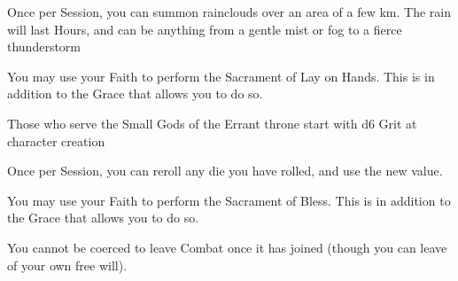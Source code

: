 {\GOD[
Name=Tlaloc,
Link=small-god-tlaloc,
GodOf=Archon of the Rains,
Holy=a wreath of ferns and mosses
]


Once per Session, you can summon rainclouds over an area of a few km.  The rain will last Hours, and can be anything from a gentle mist or fog to a fierce thunderstorm


You may use your Faith to perform the Sacrament of Lay on Hands.  This is in addition to the Grace that allows you to do so.

\newpage






Those who serve the Small Gods of the Errant throne start with d6 Grit at character creation





\GOD[
Name=Balo,
Link=small-god-balo,
GodOf=Archon of Games and Contests,
Holy=a leather bag of bone dice hung from the neck or belt
]


Once per Session, you can reroll any die you have rolled, and use the new value.


You may use your Faith to perform the Sacrament of Bless.  This is in addition to the Grace that allows you to do so.




\GOD[
Name=Gilgamesh,
Link=small-god-gilgamesh,
GodOf=Lord of Strength and Valor,
Holy=a pair of bull's horns hung from the neck or worn as a helmet
]


You cannot be coerced to leave Combat once it has joined (though you can leave of your own free will).

}
